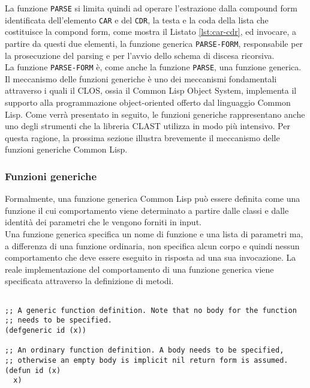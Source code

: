 La funzione \texttt{PARSE} si limita quindi ad operare l'estrazione dalla
compound form identificata dell’elemento \texttt{CAR} e del \texttt{CDR}, la
testa e la coda della lista che costituisce la compond form, come mostra il
Listato \ref{lst:car-cdr}, ed invocare, a partire da questi due elementi, la
funzione generica \texttt{PARSE-FORM}, responsabile per la prosecuzione del
parsing e per l'avvio dello schema di discesa ricorsiva.\\

La funzione \texttt{PARSE-FORM} è, come anche la funzione \texttt{PARSE}, una
funzione generica. Il meccanismo delle funzioni generiche è uno dei meccanismi
fondamentali attraverso i quali il CLOS, ossia il Common Lisp Object System,
implementa il supporto alla programmazione object-oriented offerto dal
linguaggio Common Lisp. Come verrà presentato in seguito, le funzioni generiche
rappresentano anche uno degli strumenti che la libreria CLAST utilizza in modo
più intensivo. Per questa ragione, la prossima sezione illustra brevemente il
meccanismo delle funzioni generiche Common Lisp.

\subsubsection{Funzioni generiche}
\label{generic-functions}

Formalmente, una funzione generica Common Lisp può essere definita come una
funzione il cui comportamento viene determinato a partire dalle classi e dalle
identità dei parametri che le vengono forniti in input.\\

Una funzione generica specifica un nome di funzione e una lista di parametri ma,
a differenza di una funzione ordinaria, non specifica alcun corpo e quindi
nessun comportamento che deve essere eseguito in risposta ad una sua
invocazione. La reale implementazione del comportamento di una funzione generica
viene specificata attraverso la definizione di metodi.

\begin{lstlisting}[caption=Confronto tra definizione di funzioni generiche e
ordinarie]

;; A generic function definition. Note that no body for the function
;; needs to be specified.
(defgeneric id (x))

;; An ordinary function definition. A body needs to be specified,
;; otherwise an empty body is implicit nil return form is assumed.
(defun id (x)
  x)

\end{lstlisting}


